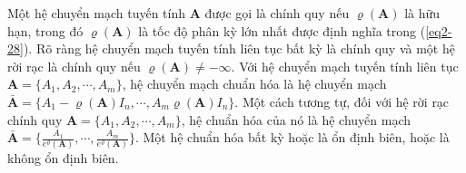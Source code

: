 \documentclass[14pt,a4paper,oneside]{report}		%
\begin{document}
Một hệ chuyển mạch tuyến tính $\mathbf{A}$ được gọi là chính quy nếu $\varrho(\mathbf{A})$ là hữu hạn, trong đó $\varrho(\mathbf{A})$ là tốc độ phân kỳ lớn nhất được định nghĩa trong (\ref{eq2-28}). Rõ ràng hệ chuyển mạch tuyến tính liên tục bất kỳ là chính quy và một hệ rời rạc là chính quy nếu $\varrho(\mathbf{A})\neq -\infty$. Với hệ chuyển mạch tuyến tính liên tục $\mathbf{A}=\{A_1,A_2,\cdots,A_m\}$, hệ chuyển mạch chuẩn hóa là hệ chuyển mạch $\bar{\mathbf{A}}=\{A_1-\varrho(\mathbf{A})I_n,\cdots,A_m\varrho(\mathbf{A})I_n\}$. Một cách tương tự, đối với hệ rời rạc chính quy $\mathbf{A}=\{A_1,A_2,\cdots,A_m\}$, hệ chuẩn hóa của nó là hệ chuyển mạch $\bar{\mathbf{A}}=\{\frac{A_1}{e^\varrho(\mathbf{A})},\cdots,\frac{A_m}{e^\varrho(\mathbf{A})}\}$. Một hệ chuẩn hóa bất kỳ hoặc là ổn định biên, hoặc là không ổn định biên.
\end{document}
